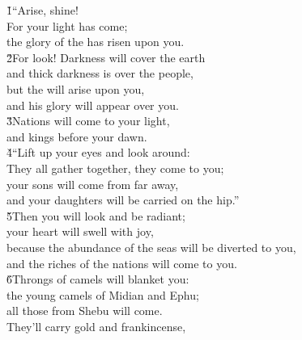 \begin{poetry}
\poeml {}
\v{1}``Arise, shine! \\
\poemll    For your light has come; \\
\poemlll       the glory of the  has risen upon you. \\
\poeml \v{2}For look! Darkness will cover the earth \\
\poemll    and thick darkness is over the people, \\
\poeml but the  will arise upon you, \\
\poemll    and his glory will appear over you. \\
\poeml \v{3}Nations will come to your light, \\
\poemll    and kings before your dawn. \\
\poeml \v{4}``Lift up your eyes and look around: \\
\poemll    They all gather together, they come to you; \\
\poeml your sons will come from far away, \\
\poemll    and your daughters will be carried on the hip.'' \\
\poeml \v{5}Then you will look and be radiant; \\
\poemll    your heart will swell with joy, \\
\poeml because the abundance of the seas will be diverted to you, \\
\poemll    and the riches of the nations will come to you. \\
\poeml \v{6}Throngs of camels will blanket you: \\
\poemll    the young camels of Midian and Ephu; \\
\poemlll       all those from Shebu will come. \\
\poeml They'll carry gold and frankincense, \\

\end{poetry}
